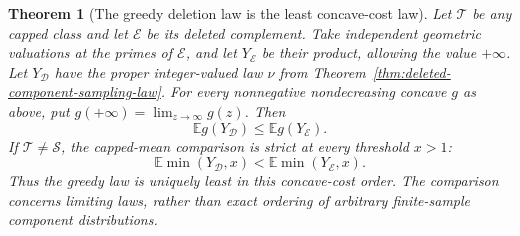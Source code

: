 \documentclass[11pt]{article}
\newtheorem{theorem}{Theorem}[section]
\theoremstyle{definition}
\begin{document}
\begin{theorem}[The greedy deletion law is the least concave-cost law]
\label{thm:greedy-geometric-concave-extremum}
Let $\mathcal T$ be any capped class and let $\mathcal E$ be its
deleted complement.
Take independent geometric valuations at the primes of $\mathcal E$,
and let $Y_{\mathcal E}$ be their product, allowing the value $+\infty$.
Let $Y_{\mathcal D}$ have the proper integer-valued law $\nu$
from Theorem~\ref{thm:deleted-component-sampling-law}.
For every nonnegative nondecreasing concave $g$ as above, put
$g(+\infty)=\lim_{z\to\infty}g(z)$. Then
\begin{equation}
                    \mathbb E g(Y_{\mathcal D})
                           \le\mathbb E g(Y_{\mathcal E}).
 \label{eq:greedy-geometric-concave-extremum}
\end{equation}
If $\mathcal T\ne\mathcal S$, the capped-mean comparison is strict
at every threshold $x>1$:
\begin{equation}
       \mathbb E\min(Y_{\mathcal D},x)
                    <\mathbb E\min(Y_{\mathcal E},x).
 \label{eq:greedy-geometric-strict-capped-mean}
\end{equation}
Thus the greedy law is uniquely least in this concave-cost order.
The comparison concerns limiting laws, rather than exact ordering
of arbitrary finite-sample component distributions.
\end{theorem}
\end{document}
